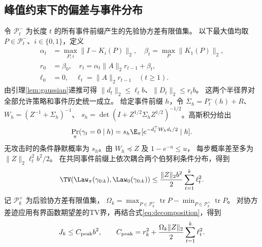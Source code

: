\subsection{峰值约束下的偏差与事件分布}
令 $\mathcal P_t^-$ 为长度 $t$ 的所有事件前缀产生的先验协方差有限值集。
以下最大值均取 $P\in\mathcal P_t^-$、$i\in\{0,1\}$，定义
\begin{equation}
 \begin{aligned}
 \alpha_t&=\max_{P,i}\|I-K_i(P)\|_2,\quad
 \beta_t=\max_P\|K_1(P)\|_2,\\
 r_0&=\beta_0,\quad r_t=\alpha_t\|A\|_2r_{t-1}+\beta_t,\\
 \ell_0&=0,\quad \ell_t=\|A\|_2r_{t-1}\quad(t\ge1).
 \end{aligned}
 \label{eq:radii}
\end{equation}
由引理\ref{lem:gaussian}递推可得 $\|d_t\|_2\le\ell_tb$、$\|D_t\|_2\le r_tb$。
这两个半径界对全部允许策略和事件历史统一成立。
给定事件前缀 $h$，令 $\Sigma_h=P_t^-(h)+R$、
$W_h=(Z^{-1}+\Sigma_h)^{-1}$、
$s_h=\det(I+Z^{1/2}\Sigma_hZ^{1/2})^{-1/2}$。高斯积分给出
\begin{equation}
 \Pr_\pi(\gamma_t=0\mid h)
 =s_h\E_\pi[e^{-d_t^\top W_hd_t/2}\mid h].
 \label{eq:prefix-silence}
\end{equation}
无攻击时的条件静默概率为 $s_h$。由 $W_h\preceq Z$ 及 $1-e^{-u}\le u$，
每步概率差至多为 $\|Z\|_2\ell_t^2b^2/2$。
在共同事件前缀上依次耦合两个伯努利条件分布，得到
\begin{equation}
 \TV(\Law_\pi(\gamma_{0:k}),\Law_0(\gamma_{0:k}))
 \le\frac{\|Z\|_2b^2}{2}\sum_{t=1}^k\ell_t^2.
 \label{eq:prefix-tv}
\end{equation}
记 $\mathcal P_k^+$ 为后验协方差有限值集，
$\Omega_k=\max_{P\in\mathcal P_k^+}\operatorname{tr}P-
\min_{P\in\mathcal P_k^+}\operatorname{tr}P$。
对协方差迹应用有界函数期望差的TV界，再结合式\eqref{eq:decomposition}，得到
\begin{equation}
 J_k\le C_{\rm peak}b^2,\qquad
 C_{\rm peak}=r_k^2+\frac{\Omega_k\|Z\|_2}{2}\sum_{t=1}^k\ell_t^2.
 \label{eq:peak-bound}
\end{equation}

